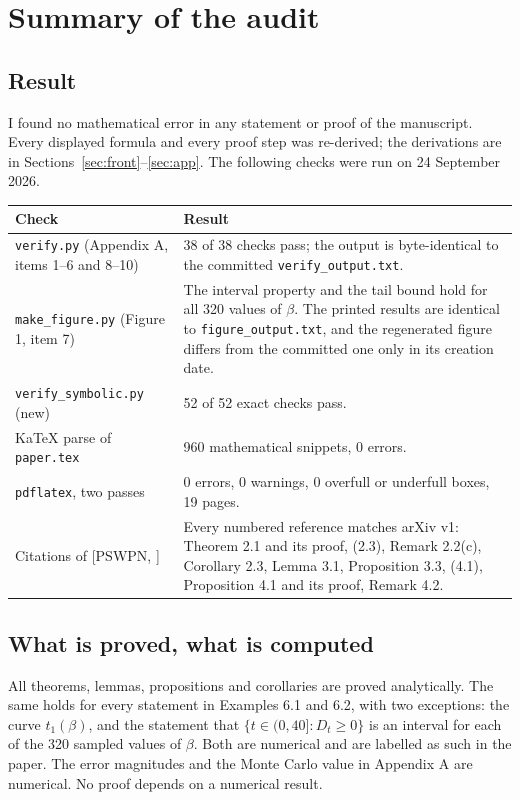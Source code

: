 \documentclass[11pt]{amsart}
\newcommand{\file}[1]{\texttt{#1}}
\newcommand{\PS}[1][]{[PSWPN\ifx\relax#1\relax\else, #1\fi]}
\begin{document}
\section{Summary of the audit}\label{sec:summary}

\subsection{Result}
I found no mathematical error in any statement or proof of the manuscript. Every displayed formula and every proof step
was re-derived; the derivations are in Sections~\ref{sec:front}--\ref{sec:app}. The following checks were run on 24
September 2026.

\medskip
{\small
\begin{longtable}{L{140pt}L{196pt}}
\toprule
Check & Result\\
\midrule
\endhead
\file{verify.py} (Appendix A, items 1--6 and 8--10) & 38 of 38 checks pass; the output is byte-identical to the
committed \file{verify\_output.txt}.\\
\file{make\_figure.py} (Figure 1, item 7) & The interval property and the tail bound hold for all 320 values of
$\beta$. The printed results are identical to \file{figure\_output.txt}, and the regenerated figure differs from the
committed one only in its creation date.\\
\file{verify\_symbolic.py} (new) & 52 of 52 exact checks pass.\\
KaTeX parse of \file{paper.tex} & 960 mathematical snippets, 0 errors.\\
\file{pdflatex}, two passes & 0 errors, 0 warnings, 0 overfull or underfull boxes, 19 pages.\\
Citations of \PS & Every numbered reference matches arXiv v1: Theorem 2.1 and its proof, (2.3), Remark 2.2(c),
Corollary 2.3, Lemma 3.1, Proposition 3.3, (4.1), Proposition 4.1 and its proof, Remark 4.2.\\
\bottomrule
\end{longtable}
}

\subsection{What is proved, what is computed}
All theorems, lemmas, propositions and corollaries are proved analytically. The same holds for every statement in
Examples 6.1 and 6.2, with two exceptions: the curve $t_1(\beta)$, and the statement that $\{t\in(0,40]:D_t\ge0\}$ is
an interval for each of the 320 sampled values of $\beta$. Both are numerical and are labelled as such in the paper.
The error magnitudes and the Monte Carlo value in Appendix A are numerical. No proof depends on a numerical result.
\end{document}

